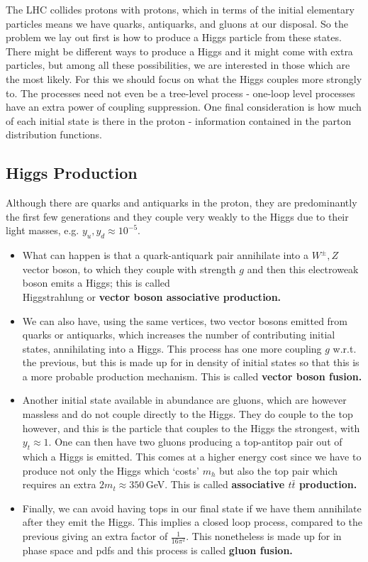 \documentclass[relqm.tex]{subfiles}
\begin{document}
The LHC collides protons with protons, which in terms of the initial elementary particles means we have quarks, antiquarks, and gluons at our disposal. 
So the problem we lay out first is how to produce a Higgs particle from these states. 
There might be different ways to produce a Higgs and it might come with extra particles, but among all these possibilities, we are interested in those which are the most likely. 
For this we should focus on what the Higgs couples more strongly to. 
The processes need not even be a tree-level process - one-loop level processes have an extra power of coupling suppression. 
One final consideration is how much of each initial state is there in the proton - information contained in the parton distribution functions. 

\subsection{Higgs Production}
Although there are quarks and antiquarks in the proton, they are predominantly the first few generations and they couple very weakly to the Higgs due to their light masses, e.g. $y_u,y_d\approx10^{-5}$.
\begin{itemize}
    \item What can happen is that a quark-antiquark pair annihilate into a $W^\pm,Z$ vector boson, to which they couple with strength $g$ and then this electroweak boson emits a Higgs; this is called \\ Higgstrahlung or \textbf{vector boson associative production.}
    \item We can also have, using the same vertices, two vector bosons emitted from quarks or antiquarks, which increases the number of contributing initial states, annihilating into a Higgs. 
        This process has one more coupling $g$ w.r.t. the previous, but this is made up for in density of initial states so that this is a more probable production mechanism. 
        This is called \textbf{vector boson fusion.}
    \item Another initial state available in abundance are gluons, which are however massless and do not couple directly to the Higgs. 
        They do couple to the top however, and this is the particle that couples to the Higgs the strongest, with $y_t\approx1$.
        One can then have two gluons producing a top-antitop pair out of which a Higgs is emitted. 
        This comes at a higher energy cost since we have to produce not only the Higgs which `costs' $m_h$ but also the top pair which requires an extra $2m_t\approx350\,$GeV.
        This is called \textbf{associative $t\bar{t}$ production.}
    \item Finally, we can avoid having tops in our final state if we have them annihilate after they emit the Higgs. 
        This implies a closed loop process, compared to the previous giving an extra factor of $\frac{1}{16\pi^2}$.
        This nonetheless is made up for in phase space and pdfs and this process is called \textbf{gluon fusion.}
\end{itemize}
\end{document}

